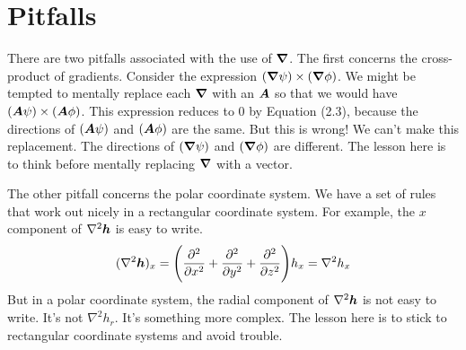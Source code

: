 \section{Pitfalls}

There are two pitfalls associated with the use of $\boldsymbol{\nabla}$.
The first concerns the cross-product of gradients.
Consider the expression $(\boldsymbol{\nabla} \psi) \times (\boldsymbol{\nabla} \phi)$.
We might be tempted to mentally replace each $\boldsymbol{\nabla}$ with an $\boldsymbol{A}$
so that we would have $(\boldsymbol{A} \psi) \times (\boldsymbol{A} \phi)$.
This expression reduces to 0 by Equation (2.3),
because the directions of $(\boldsymbol{A} \psi)$ and $(\boldsymbol{A} \phi)$ are the same.
But this is wrong! We can't make this replacement.
The directions of $(\boldsymbol{\nabla} \psi)$ and $(\boldsymbol{\nabla} \phi)$ are different.
The lesson here is to think before mentally replacing $\boldsymbol{\nabla}$ with a vector.

The other pitfall concerns the polar coordinate system.
We have a set of rules that work out nicely in a rectangular coordinate system.
For example, the $x$ component of $\nabla^2 \boldsymbol{h}$ is easy to write.
\begin{equation}
  (\nabla^2 \boldsymbol{h})_x
  = \Bigg(\frac{\partial ^2}{\partial x^2}+\frac{\partial ^2}{\partial y^2}+\frac{\partial ^2}{\partial z^2}\Bigg) h_x
  = \nabla^2 h_x
\end{equation}
But in a polar coordinate system, the radial component of $\nabla^2 \boldsymbol{h}$
is not easy to write.  It's not $\nabla^2 h_r$. It's something more complex.
The lesson here is to stick to rectangular coordinate systems and avoid trouble.


